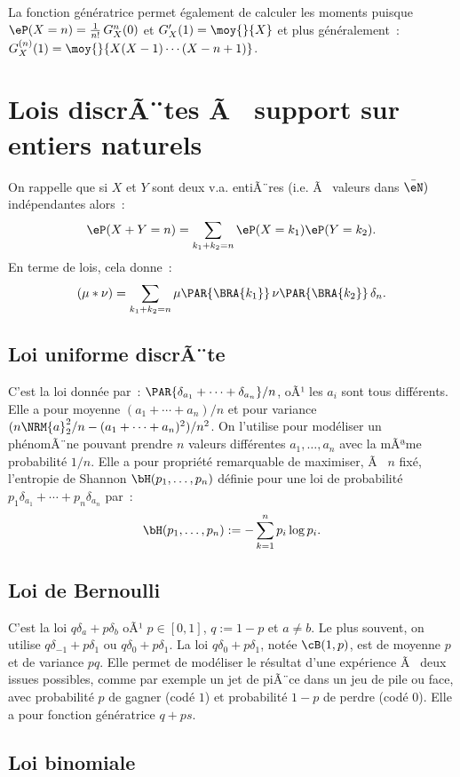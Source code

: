 {{La fonction génératrice permet également de calculer les moments puisque
$\eP(X=n)=\frac{1}{n!}\,G^{n}_X(0)$ et $G_X'(1)=\moy{}{X}$ et plus
généralement~: $G_X^{(n)}(1)=\moy{}{X(X-1)\cdots(X-n+1)}$.


%
\section{Lois discrÃ¨tes Ã  support sur entiers naturels}
%

On rappelle que si $X$ et $Y$ sont deux v.a. entiÃ¨res (i.e. Ã  valeurs dans
$\bar{\eN})$ indépendantes alors~:
$$
\eP(X+Y=n)=\sum_{k_1+k_2=n}\eP(X=k_1)\eP(Y=k_2).
$$
En terme de lois, cela donne~:
$$
(\mu*\nu)=\sum_{k_1+k_2=n}\mu\PAR{\BRA{k_1}}\,\nu\PAR{\BRA{k_2}}\,\delta_n.
$$

%
\subsection{Loi uniforme discrÃ¨te}\label{ss:loi:uniforme-discrete}
%

C'est la loi donnée par~: $\PAR{\delta_{a_1}+\cdots+\delta_{a_n}}/n$, oÃ¹ les $a_i$ sont
tous différents. Elle a pour moyenne $(a_1+\cdots+a_n)/n$ et pour variance
$(n\NRM{a}_2^2/n-(a_1+\cdots+a_n)^2)/n^2$. On l'utilise pour modéliser un phénomÃ¨ne
pouvant prendre $n$ valeurs différentes $a_1,\ldots,a_n$ avec la mÃªme probabilité
$1/n$. Elle a pour propriété remarquable de maximiser, Ã  $n$ fixé, l'entropie
de Shannon $\bH(p_1,\ldots,p_n)$ définie pour une loi de probabilité
$p_1\delta_{a_1}+\cdots+p_n\delta_{a_n}$ par~:
$$
\bH(p_1,\ldots,p_n):=-\sum_{k=1}^n p_i\log p_i.
$$

%
\subsection{Loi de Bernoulli}\label{ss:loi:bernoulli}
%

C'est la loi $q\delta_a+p\delta_b$ oÃ¹ $p\in[0,1]$, $q:=1-p$ et $a\neq b$. Le plus
souvent, on utilise $q\delta_{-1}+p\delta_1$ ou $q\delta_0+p\delta_1$.  La loi
$q\delta_0+p\delta_1$, notée $\cB(1,p)$, est de moyenne $p$ et de variance $pq$.
Elle permet de modéliser le résultat d'une expérience Ã  deux issues possibles,
comme par exemple un jet de piÃ¨ce dans un jeu de pile ou face, avec
probabilité $p$ de gagner (codé $1$) et probabilité $1-p$ de perdre (codé
$0$). Elle a pour fonction génératrice $q+ps$.

%
\subsection{Loi binomiale}\label{ss:loi:binomiale}
%

}}
